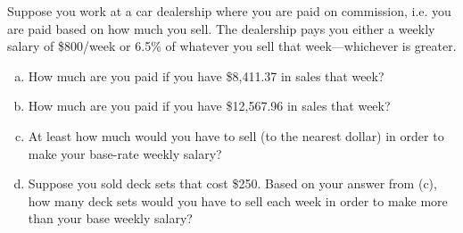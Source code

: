 \documentclass[11pt,letterpaper]{article}
\begin{document}
\newpage



 Suppose you work at a car dealership where you are paid on commission, i.e. you are paid based on how much you sell. The dealership pays you either a weekly salary of \$800/week or 6.5\% of whatever you sell that week---whichever is greater.
\begin{enumerate}[(a)]
\item How much are you paid if you have \$8,411.37 in sales that week?
\item How much are you paid if you have \$12,567.96 in sales that week?
\item At least how much would you have to sell (to the nearest dollar) in order to make your base-rate weekly salary?
\item Suppose you sold deck sets that cost \$250. Based on your answer from (c), how many deck sets would you have to sell each week in order to make more than your base weekly salary? 
\end{enumerate}


\end{document}

